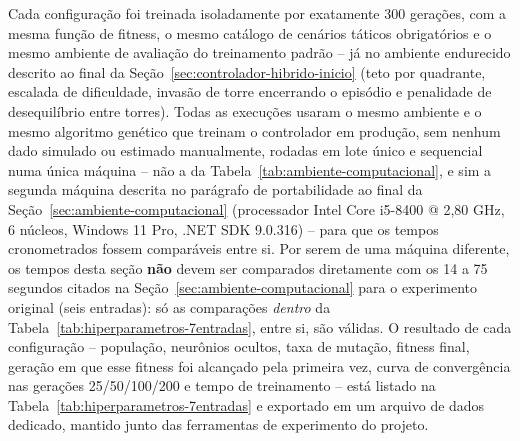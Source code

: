 \documentclass[12pt,a4paper]{article}
\begin{document}
Cada configuração foi treinada isoladamente por exatamente 300 gerações, com a mesma função de
fitness, o mesmo catálogo de cenários táticos obrigatórios e o
mesmo ambiente de avaliação do treinamento padrão -- já no ambiente endurecido descrito ao final da
Seção~\ref{sec:controlador-hibrido-inicio} (teto por quadrante, escalada de dificuldade, invasão de
torre encerrando o episódio e penalidade de desequilíbrio entre torres). Todas as execuções usaram
o mesmo ambiente e o mesmo algoritmo genético que treinam o controlador
em produção, sem nenhum dado simulado ou estimado manualmente, rodadas em lote único e sequencial
numa única máquina -- não a da Tabela~\ref{tab:ambiente-computacional}, e sim a segunda máquina
descrita no parágrafo de portabilidade ao final da Seção~\ref{sec:ambiente-computacional}
(processador Intel Core i5-8400 @ 2,80 GHz, 6 núcleos, Windows 11 Pro, .NET SDK 9.0.316) -- para que
os tempos cronometrados fossem comparáveis entre si. Por serem de uma máquina diferente, os tempos
desta seção \textbf{não} devem ser comparados diretamente com os 14 a 75 segundos citados na
Seção~\ref{sec:ambiente-computacional} para o experimento original (seis entradas): só as
comparações \emph{dentro} da Tabela~\ref{tab:hiperparametros-7entradas}, entre si, são válidas. O resultado de cada configuração -- população, neurônios ocultos, taxa
de mutação, fitness final, geração em que esse fitness foi alcançado pela primeira vez, curva de
convergência nas gerações 25/50/100/200 e tempo de treinamento -- está listado na
Tabela~\ref{tab:hiperparametros-7entradas} e exportado em um arquivo de dados dedicado, mantido
junto das ferramentas de experimento do projeto.
\end{document}
